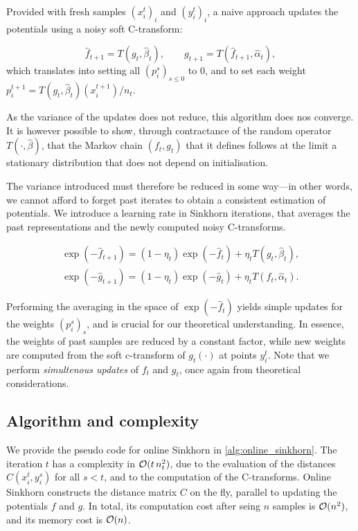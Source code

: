 Provided with fresh
 samples $(x_i^t)_i$ and $(y_i^t)_i$, a naive approach updates the potentials using a noisy soft C-transform:

\begin{equation}
    \hat f_{t+1} = T(g_t, \hat \beta_t),\qquad g_{t+1} = T(\hat f_{t+1}, \hat \alpha_t),
\end{equation}
which translates into setting all $(p_i^s)_{s \leq 0}$ to 0, and to set each weight
 $p_i^{t+1} = T(g_t, \hat \beta_t)(x_i^{t+1}) / n_t$.

As the variance of the updates does not reduce, this algorithm does nos
converge. It is however possible to show, through contractance of the random
operator $T(\cdot, \hat \beta)$, that the Markov chain $(f_t, g_t)$ that it
defines follows at the limit a stationary distribution that does not depend on initialisation.

The variance introduced must therefore be reduced in some way---in other words, we cannot afford to forget past iterates to obtain a consistent estimation of potentials. We introduce a learning rate in Sinkhorn iterations, that averages the past representations and the newly computed noisy C-transforms.

\begin{align}
    \exp(-\hat f_{t+1}) = (1 - \eta_t) \exp(-\hat f_t) + \eta_t T(g_t, \hat \beta_t), \\
    \exp(-\hat g_{t+1}) = (1 - \eta_t) \exp(-\hat g_t) + \eta_t T(f_t, \hat \alpha_t).
\end{align}

Performing the averaging in the space of $\exp(-\hat f_{t})$ yields simple
updates for the weights $(p_i^s)_s$, and is crucial for our theoretical
understanding. In essence, the weights of past samples are reduced by a constant
factor, while new weights are computed from the soft c-transform of $g_t(\cdot)$ at
points $y_i^t$. Note that we perform \textit{simultenous updates} of $f_t$ and
$g_t$, once again from theoretical considerations.

\subsection{Algorithm and complexity}

We provide the pseudo code for online Sinkhorn in \autoref{alg:online_sinkhorn}.
The iteration $t$ has a complexity in $\mathcal{O}(t\,n_t^2)$, due to the evaluation of
the distances $C(x_i^t, y_i^s)$ for all $s < t$, and to the computation of
the C-transforms. Online Sinkhorn constructs the distance matrix $C$ on the
fly, parallel to updating the potentials $f$ and $g$. In total, its computation
cost after seing $n$ samples is $\mathcal{O}(n^2)$, and its memory cost is $\mathcal{O}(n)$.


